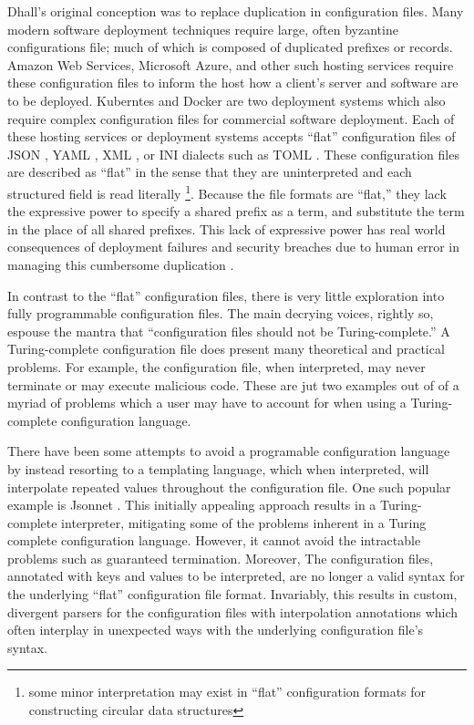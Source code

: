 \documentclass[12pt]{diazessay}
\begin{document}
Dhall's original conception was to replace duplication in configuration files.
Many modern software deployment techniques require large, often byzantine configurations file; \cite{cuperus1995automatic} much of which is composed of duplicated prefixes or records.
Amazon Web Services, Microsoft Azure, and other such hosting services require these configuration files to inform the host how a client's server and software are to be deployed.
Kuberntes \cite{Kubernetes2015} and Docker \cite{Barbier2014} are two deployment systems which also require complex configuration files for commercial software deployment.
Each of these hosting services or deployment systems accepts ``flat'' configuration files of JSON \cite{ecma2017standard}, YAML \cite{ben2009yaml}, XML \cite{bray2000extensible}, or INI dialects such as TOML \cite{TOML}.
These configuration files are described as ``flat'' in the sense that they are uninterpreted and each structured field is read literally \footnote{some minor interpretation may exist in ``flat'' configuration formats for constructing circular data structures}.
Because the file formats are ``flat,'' they lack the expressive power to specify a shared prefix as a term, and substitute the term in the place of all shared prefixes.
This lack of expressive power has real world consequences of deployment failures and security breaches due to human error in managing this cumbersome duplication \cite{Fugue2020}.

In contrast to the ``flat'' configuration files, there is very little exploration into fully programmable configuration files.
The main decrying voices, rightly so, espouse the mantra that ``configuration files should not be Turing-complete.'' A Turing-complete \cite{turing1937computable} configuration file does present many theoretical and practical problems.
For example, the configuration file, when interpreted, may never terminate or may execute malicious code.
These are jut two examples out of of a myriad of problems which a user may have to account for when using a Turing-complete configuration language.

There have been some attempts to avoid a programable configuration language by instead resorting to a templating language, which when interpreted, will interpolate repeated values throughout the configuration file.
One such popular example is Jsonnet \cite{JSONnet}.
This initially appealing approach results in a Turing-complete interpreter, mitigating some of the problems inherent in a Turing complete configuration language.
However, it cannot avoid the intractable problems such as guaranteed termination.
Moreover, The configuration files, annotated with keys and values to be interpreted, are no longer a valid syntax for the underlying ``flat'' configuration file format.
Invariably, this results in custom, divergent parsers for the configuration files with interpolation annotations which often interplay in unexpected ways with the underlying configuration file's syntax.
\end{document}
